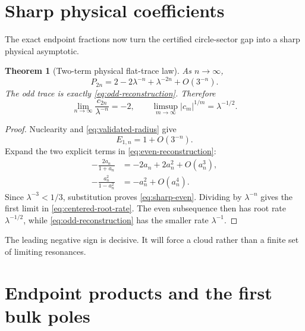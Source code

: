\documentclass[11pt]{article}
\newtheorem{theorem}{Theorem}[section]
\theoremstyle{definition}
\theoremstyle{remark}
\begin{document}
\section{Sharp physical coefficients}
\label{sec:sharp-coefficients}

The exact endpoint fractions now turn the certified circle-sector gap into a
sharp physical asymptotic.

\begin{theorem}[Two-term physical flat-trace law]
\label{thm:sharp-physical}
As $n\to\infty$,
\begin{equation}\label{eq:sharp-even}
 \boxed{
 P_{2n}
 =2-2\lambda^{-n}+\lambda^{-2n}+O(3^{-n}).}
\end{equation}
The odd trace is exactly \eqref{eq:odd-reconstruction}.  Therefore
\begin{equation}\label{eq:centered-root-rate}
 \lim_{n\to\infty}
 \frac{c_{2n}}{\lambda^{-n}}=-2,
 \qquad
 \limsup_{m\to\infty}|c_m|^{1/m}=\lambda^{-1/2}.
\end{equation}
\end{theorem}

\begin{proof}
Nuclearity and \eqref{eq:validated-radius} give
\begin{equation}\label{eq:E-one-decay}
 E_{1,n}=1+O(3^{-n}).
\end{equation}
Expand the two explicit terms in \eqref{eq:even-reconstruction}:
\begin{align*}
 -\frac{2a_n}{1+a_n}
 &=-2a_n+2a_n^2+O(a_n^3),\\
 -\frac{a_n^2}{1-a_n^2}
 &=-a_n^2+O(a_n^4).
\end{align*}
Since $\lambda^{-3}<1/3$, substitution proves \eqref{eq:sharp-even}.
Dividing by $\lambda^{-n}$ gives the first limit in
\eqref{eq:centered-root-rate}.  The even subsequence then has root rate
$\lambda^{-1/2}$, while \eqref{eq:odd-reconstruction} has the smaller rate
$\lambda^{-1}$.
\end{proof}

The leading negative sign is decisive.  It will force a cloud rather than a
finite set of limiting resonances.

\section{Endpoint products and the first bulk poles}
\label{sec:factorization}
\end{document}
